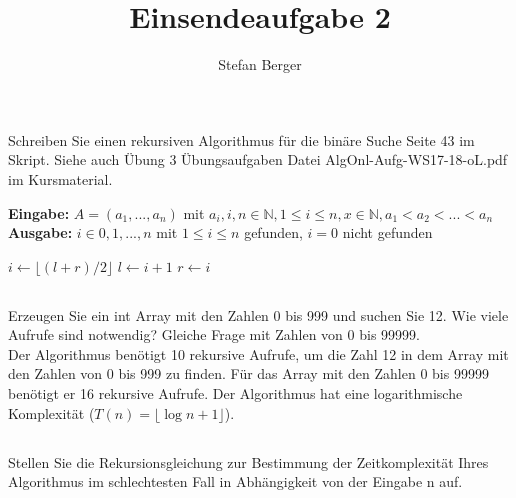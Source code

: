 \documentclass{article} %
\begin{document}
\title{\Large Einsendeaufgabe 2}
\author{\normalsize Stefan Berger}
\date{}
\maketitle

\subsection{}
Schreiben Sie einen rekursiven Algorithmus für die binäre Suche Seite 43 im Skript. Siehe auch
Übung 3 Übungsaufgaben Datei AlgOnl-Aufg-WS17-18-oL.pdf im Kursmaterial.\\

\begin{algorithm}
\textbf{Eingabe:} $A=(a_1, ..., a_n)$ mit $a_i, i, n \in \mathbb{N}, 1 \leq i \leq n, x \in \mathbb{N}, a_1<a_2<...<a_n$\\
\textbf{Ausgabe:} $i \in {0, 1, ..., n}$ mit $1 \leq i \leq n$ gefunden, $i=0$ nicht gefunden\\
\begin{algorithmic}[1]

\State {}
	\State {}
	\EndIf
	\State $i\gets \lfloor{(l+r)/2} \rfloor$
	\State {}
	\EndIf
	\State $l\gets i+1$
	\Else
	\State $r\gets i$
	\EndIf
	\State \Return {}
\EndFunction
\end{algorithmic}
\end{algorithm}
\subsection{}
Erzeugen Sie ein int Array mit den Zahlen 0 bis 999 und suchen Sie 12. Wie viele Aufrufe sind
notwendig? Gleiche Frage mit Zahlen von 0 bis 99999.\\

Der Algorithmus benötigt 10 rekursive Aufrufe, um die Zahl 12 in dem Array mit den Zahlen von 0 bis 999 zu finden. Für das 
Array mit den Zahlen 0 bis 99999 benötigt er 16 rekursive Aufrufe. Der Algorithmus hat eine logarithmische Komplexität ($T(n) = \lfloor{\log n + 1}\rfloor$).

\pagebreak
\subsection{}
Stellen Sie die Rekursionsgleichung zur Bestimmung der Zeitkomplexität Ihres Algorithmus im
schlechtesten Fall in Abhängigkeit von der Eingabe n auf.\\
\end{document}
